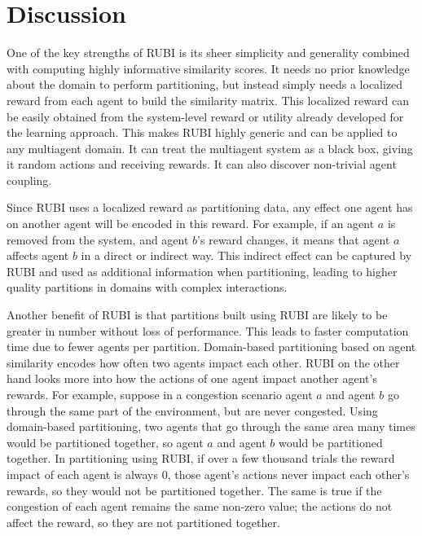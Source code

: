 \documentclass[letterpaper]{article}
\begin{document}
\section{Discussion}

One of the key strengths of RUBI is its sheer simplicity and generality combined with computing highly informative similarity scores. It needs no prior knowledge about the domain to perform partitioning, but instead simply needs a localized reward from each agent to build the similarity matrix. This localized reward can be easily obtained from the system-level reward or utility already developed for the learning approach. This makes RUBI highly generic and can be applied to any multiagent domain. It can treat the multiagent system as a black box, giving it random actions and receiving rewards. It can also discover non-trivial agent coupling. 

Since RUBI uses a localized reward as partitioning data, any effect one agent has on another agent will be encoded in this reward. For example, if an agent $a$ is removed from the system, and agent $b$'s reward changes, it means that agent $a$ affects agent $b$ in a direct or indirect way. This indirect effect can be captured by RUBI and used as additional information when partitioning, leading to higher quality partitions in domains with complex interactions.

Another benefit of RUBI is that partitions built using RUBI are likely to be greater in number without loss of performance. This leads to faster computation time due to fewer agents per partition. Domain-based partitioning based on agent similarity encodes how often two agents impact each other. RUBI on the other hand looks more into how the actions of one agent impact another agent's rewards. For example, suppose in a congestion scenario agent $a$ and agent $b$ go through the same part of the environment, but are never congested. Using domain-based partitioning, two agents that go through the same area many times would be partitioned together, so agent $a$ and agent $b$ would be partitioned together. In partitioning using RUBI, if over a few thousand trials the reward impact of each agent is always 0, those agent's actions never impact each other's rewards, so they would not be partitioned together. The same is true if the congestion of each agent remains the same non-zero value; the actions do not affect the reward, so they are not partitioned together. %
\end{document}
